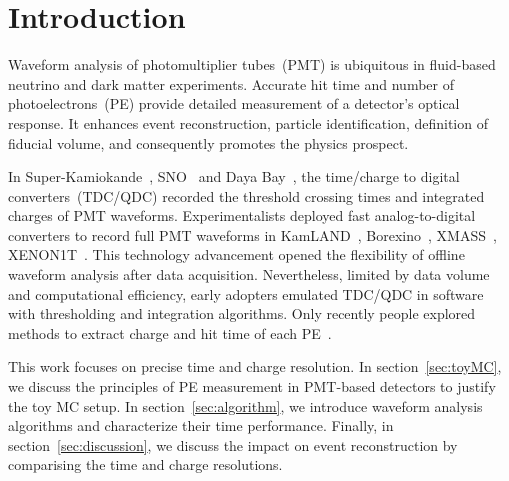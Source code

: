 \section{Introduction}
\label{sec:introduction}

Waveform analysis of photomultiplier tubes~(PMT) is ubiquitous in fluid-based neutrino and dark matter experiments. Accurate hit time and number of photoelectrons~(PE) provide detailed measurement of a detector's optical response. It enhances event reconstruction, particle identification, definition of fiducial volume, and consequently promotes the physics prospect.

In Super-Kamiokande~\cite{noauthor_super-kamiokande_2003}, SNO~\cite{dunger_event_2019} and Daya Bay~\cite{daya_bay_collaboration_measurement_2017}, the time/charge to digital converters~(TDC/QDC) recorded the threshold crossing times and integrated charges of PMT waveforms.  Experimentalists deployed fast analog-to-digital converters to record full PMT waveforms in KamLAND~\cite{kamland_collaboration_production_2010}, Borexino~\cite{alimonti_borexino_2009}, XMASS~\cite{abe_xmass_2013}, XENON1T~\cite{xenon_collaboration_xenon1t_2019}.  This technology advancement opened the flexibility of offline waveform analysis after data acquisition.  Nevertheless, limited by data volume and computational efficiency, early adopters emulated TDC/QDC in software with thresholding and integration algorithms.  Only recently people explored methods to extract charge and hit time of each PE~\cite{zhang_comparison_2019}.

This work focuses on precise time and charge resolution. In section~\ref{sec:toyMC}, we discuss the principles of PE measurement in PMT-based detectors to justify the toy MC setup.  In section~\ref{sec:algorithm}, we introduce waveform analysis algorithms and characterize their time performance.  Finally, in section~\ref{sec:discussion}, we discuss the impact on event reconstruction by comparising the time and charge resolutions.
